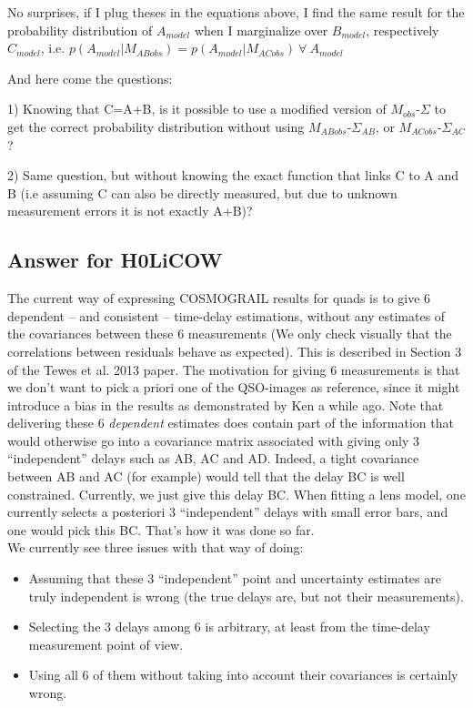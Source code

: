 \documentclass[11pt]{scrartcl}
\begin{document}
No surprises, if I plug theses in the equations above, I find the 
same result for the probability distribution of $A_{model}$ when I 
marginalize over $B_{model}$, respectively $C_{model}$, i.e. 
$p(A_{model}|M_{ABobs}) = 
p(A_{model}|M_{ACobs})  \ \forall \ A_{model} $ 

And here come the questions:

 1) Knowing that C=A+B, is it possible to use a modified version of 
$M_{obs}$-$\Sigma$ to get the correct probability distribution without 
using 
$M_{ABobs}$-$\Sigma_{AB}$, or $M_{ACobs}$-$\Sigma_{AC}$? 

 2) Same question, but without knowing the exact function that links 
C to A and B (i.e assuming C can also be directly measured, but due to 
unknown measurement errors it is not exactly A+B)?
 

\newpage
\subsection{Answer for H0LiCOW}

The current way of expressing COSMOGRAIL results for quads is to give 6 
dependent -- and consistent -- time-delay estimations, without any 
estimates of the covariances between these 6 measurements (We 
only check visually that the correlations between residuals behave as 
expected). This is described in Section 3 of the Tewes et al. 2013 
paper. The motivation for giving 6 measurements is that we don't want to 
pick a priori one of the QSO-images as reference, since it might 
introduce a bias in the results as demonstrated by Ken a while ago. 
Note that delivering these 6 \emph{dependent} estimates does contain 
part of the information that would otherwise go into a covariance 
matrix associated with giving only 3 ``independent'' delays such as AB, 
AC and AD. Indeed, a tight covariance between AB and AC (for example) 
would tell that the delay BC is well constrained. Currently, we just 
give this delay BC. When fitting a lens model, one currently selects a 
posteriori 3 ``independent'' delays with small error bars, and one would 
pick this BC. That's how it was done so far.\\

We currently see three issues with that way of doing:

\begin{itemize}
\item Assuming that these 3 ``independent'' point and uncertainty 
estimates are truly independent is wrong (the true delays are, but not 
their measurements). 
\item Selecting the 3 delays among 6 is arbitrary, at least from the 
time-delay measurement point of view.
\item Using all 6 of them without taking into account their covariances 
is certainly wrong.
\end{itemize}
\end{document}
